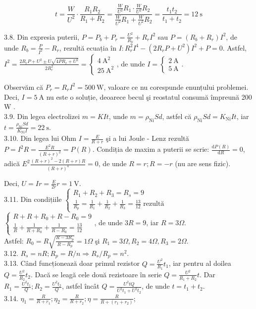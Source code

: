 \documentclass[10pt]{article}
\begin{document}
$$
t=\frac{W}{U^{2}} \cdot \frac{R_{1} R_{2}}{R_{1}+R_{2}}=\frac{\frac{W}{U^{2}} R_{1} \cdot \frac{W}{U^{2}} R_{2}}{\frac{W}{U^{2}} R_{1}+\frac{W}{U^{2}} R_{2}}=\frac{t_{1} t_{2}}{t_{1}+t_{2}}=12 \mathrm{~s}
$$

3.8. Din expresia puterii, $P=P_{b}+P_{r}=\frac{U^{2}}{R_{b}}+R_{r} I^{2}$ sau $P=\left(R_{b}+R_{r}\right) I^{2}$, de unde $R_{b}=\frac{P}{I^{2}}-R_{r}$, rezultă ecuația în $I: R_{r}^{2} I^{4}-\left(2 R_{r} P+U^{2}\right) I^{2}+P=0$. Astfel, $I^{2}=\frac{2 R_{r} P+U^{2} \pm U \sqrt{4 P R_{r}+U^{2}}}{2 R_{r}^{2}}=\left\{\begin{array}{l}4 \mathrm{~A}^{2} \\ 25 \mathrm{~A}^{2}\end{array}\right.$, de unde $I=\left\{\begin{array}{l}2 \mathrm{~A} \\ 5 \mathrm{~A}\end{array}\right.$.

Observăm că $P_{r}=R_{r} I^{2}=500 \mathrm{~W}$, valoare ce nu corespunde enunțului problemei. Deci, $I=5 \mathrm{~A}$ nu este o soluție, deoarece becul şi reostatul consumă împreună 200 W .\\
3.9. Din legea electrolizei $m=K I t$, unde $m=\rho_{\mathrm{Ni}} S d$, astfel că $\rho_{\mathrm{Ni}} S d=K_{\mathrm{Ni}} I t$, iar $t=\frac{\rho_{\mathrm{Ni}} S d}{K_{\mathrm{Ni}} I}=22 \mathrm{~s}$.\\
3.10. Din legea lui Ohm $I=\frac{E}{R+r}$ şi a lui Joule - Lenz rezultă $P=I^{2} R=\frac{E^{2} R}{(R+r)^{2}}=P(R)$. Condiția de maxim a puterii se scrie: $\frac{\mathrm{d} P(R)}{\mathrm{d} R}=0$, adică $E^{2} \frac{(R+r)^{2}-2(R+r) R}{(R+r)^{4}}=0$, de unde $R=r ; R=-r$ (nu are sens fizic).

Deci, $U=I r=\frac{E}{2 r} r=1 \mathrm{~V}$.\\
3.11. Din condițiile $\left\{\begin{array}{l}R_{1}+R_{2}+R_{3}=R_{s}=9 \\ \frac{1}{R_{p}}=\frac{1}{R_{1}}+\frac{1}{R_{2}}+\frac{1}{R_{3}}=\frac{13}{12} \text { rezultă }\end{array}\right.$ $\left\{\begin{array}{l}R+R+R_{0}+R-R_{0}=9 \\ \frac{1}{R}+\frac{1}{R+R_{0}}+\frac{1}{R-R_{0}}=\frac{13}{12}\end{array}\right.$, de unde $3 R=9$, iar $R=3 \Omega$.\\
Astfel: $R_{0}=R \sqrt{\frac{R-3 R_{p}}{R-R_{p}}}=1 \Omega$ şi $R_{1}=3 \Omega, R_{2}=4 \Omega, R_{3}=2 \Omega$.\\
3.12. $R_{s}=n R ; R_{p}=R / n \Rightarrow R_{s} / R_{p}=n^{2}$.\\
3.13. Când funcționează doar primul rezistor $Q=\frac{U^{2}}{R_{1}} t_{1}$, iar pentru al doilea $Q=\frac{U^{2}}{R_{2}} t_{2}$. Dacă se leagă cele două rezistoare în serie $Q=\frac{U^{2}}{R_{1}+R_{2}} t$. Dar $R_{1}=\frac{U^{2} t_{1}}{Q} ; R_{2}=\frac{U^{2} t_{2}}{Q}$, astfel încât $Q=\frac{U^{2} t Q}{U^{2} t_{1}+U^{2} t_{2}}$, de unde $t=t_{1}+t_{2}$.\\
3.14. $\eta_{1}=\frac{R}{R+r_{1}} ; \eta_{2}=\frac{R}{R+r_{2}} ; \eta=\frac{R}{R+\left(r_{1}+r_{2}\right)}$;
\end{document}
